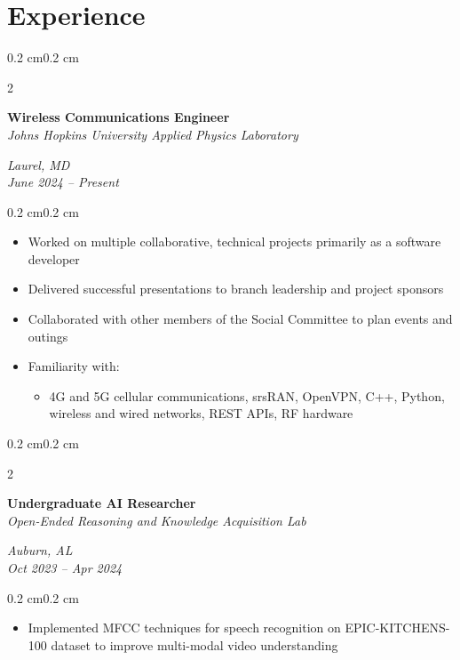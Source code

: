 \documentclass[10pt, letterpaper]{article}
\newenvironment{highlights}{
    \begin{itemize}[topsep=0.10 cm,parsep=0.10 cm,partopsep=0pt,itemsep=0pt,leftmargin=0.4 cm + 10pt]
}{
    \end{itemize}
}
\newenvironment{onecolentry}{
    \begin{adjustwidth}{0.2 cm}{0.2 cm}
}{
    \end{adjustwidth}
}
\newenvironment{twocolentry}[2][]{
    \onecolentry
    \def\secondColumn{#2}
    \setcolumnwidth{\fill, 4.5 cm}
    \begin{paracol}{2}
}{
    \switchcolumn \raggedleft \secondColumn
    \end{paracol}
    \endonecolentry
}
\begin{document}
    \section{Experience}
        \begin{twocolentry}{\textit{Laurel, MD} \\ \textit{June 2024 – Present}}
            \textbf{Wireless Communications Engineer} \\
            \textit{Johns Hopkins University Applied Physics Laboratory}
        \end{twocolentry}
        \vspace{0.10 cm}
        \begin{onecolentry}
            \begin{highlights}
                \item Worked on multiple collaborative, technical projects primarily as a software developer
                \item Delivered successful presentations to branch leadership and project sponsors
                \item Collaborated with other members of the Social Committee to plan events and outings
                \item Familiarity with:
                    \begin{highlights}
                        \item 4G and 5G cellular communications, srsRAN, OpenVPN, C++, Python, wireless and wired networks, REST APIs, RF hardware
                    \end{highlights}
            \end{highlights}
        \end{onecolentry}

        \vspace{0.2 cm}

        \begin{twocolentry}{\textit{Auburn, AL} \\ \textit{Oct 2023 – Apr 2024}}
            \textbf{Undergraduate AI Researcher} \\
            \textit{Open-Ended Reasoning and Knowledge Acquisition Lab}
        \end{twocolentry}
        \vspace{0.10 cm}
        \begin{onecolentry}
            \begin{highlights}
                \item Implemented MFCC techniques for speech recognition on EPIC-KITCHENS-100 dataset to improve multi-modal video understanding
            \end{highlights}
        \end{onecolentry}
\end{document}
